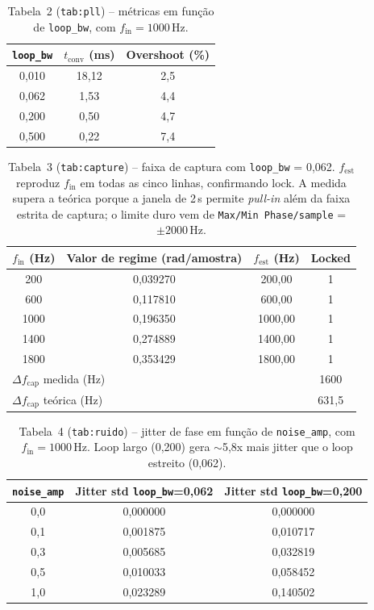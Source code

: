 \documentclass[11pt,a4paper]{article}
\begin{document}
\begin{table}[H]
  \centering
  \begin{tabular}{c c c}
    \toprule
    \texttt{loop\_bw} & $t_\text{conv}$ (ms) & Overshoot (\%) \\
    \midrule
    0{,}010 & 18{,}12 & 2{,}5 \\
    0{,}062 & 1{,}53  & 4{,}4 \\
    0{,}200 & 0{,}50  & 4{,}7 \\
    0{,}500 & 0{,}22  & 7{,}4 \\
    \bottomrule
  \end{tabular}
  \caption{Tabela~2 (\texttt{tab:pll}) -- métricas em função de \texttt{loop\_bw}, com $f_\text{in} = 1000$\,Hz.}
\end{table}

\begin{table}[H]
  \centering
  \begin{tabular}{c c c c}
    \toprule
    $f_\text{in}$ (Hz) & Valor de regime (rad/amostra) & $f_\text{est}$ (Hz) & Locked \\
    \midrule
    200  & 0{,}039270 & 200{,}00  & 1 \\
    600  & 0{,}117810 & 600{,}00  & 1 \\
    1000 & 0{,}196350 & 1000{,}00 & 1 \\
    1400 & 0{,}274889 & 1400{,}00 & 1 \\
    1800 & 0{,}353429 & 1800{,}00 & 1 \\
    \midrule
    \multicolumn{3}{l}{$\Delta f_\text{cap}$ medida (Hz)} & 1600 \\
    \multicolumn{3}{l}{$\Delta f_\text{cap}$ teórica (Hz)} & 631{,}5 \\
    \bottomrule
  \end{tabular}
  \caption{Tabela~3 (\texttt{tab:capture}) -- faixa de captura com \texttt{loop\_bw} = 0{,}062. $f_\text{est}$ reproduz $f_\text{in}$ em todas as cinco linhas, confirmando lock. A medida supera a teórica porque a janela de 2\,s permite \emph{pull-in} além da faixa estrita de captura; o limite duro vem de \texttt{Max/Min Phase/sample} = $\pm 2000$\,Hz.}
\end{table}

\begin{table}[H]
  \centering
  \begin{tabular}{c c c}
    \toprule
    \texttt{noise\_amp} & Jitter std \texttt{loop\_bw}=0{,}062 & Jitter std \texttt{loop\_bw}=0{,}200 \\
    \midrule
    0{,}0 & 0{,}000000 & 0{,}000000 \\
    0{,}1 & 0{,}001875 & 0{,}010717 \\
    0{,}3 & 0{,}005685 & 0{,}032819 \\
    0{,}5 & 0{,}010033 & 0{,}058452 \\
    1{,}0 & 0{,}023289 & 0{,}140502 \\
    \bottomrule
  \end{tabular}
  \caption{Tabela~4 (\texttt{tab:ruido}) -- jitter de fase em função de \texttt{noise\_amp}, com $f_\text{in} = 1000$\,Hz. Loop largo (0{,}200) gera $\sim$5,8x mais jitter que o loop estreito (0{,}062).}
\end{table}
\end{document}
